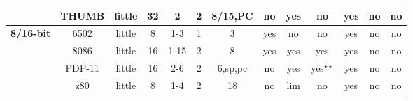 \begin{sidewaystable}[tbp]
\begin{sf}
\begin{footnotesize}
\begin{center}
\begin{tabular}{|c|c||c|c|c|c|c|c|c|c|c|c|c|}
                 & %
THUMB            & %
little           & %
32               & %
2                & %
2                & %
8/15,PC          & %
no               & %
yes              & %
no               & %
yes              & %
no               & %
no                 %
\\
\cline{2-13}

\hline
\hline

\multirow{3}{*}{\bf 8/16-bit} &
6502             & %
little           & %
8                & %
1-3              & %
1                & %
3                & %
yes              & %
no               & %
no               & %
yes              & %
no               & %
no                 %
\\
\cline{2-13}

                 & %
8086             & %
little           & %
16               & %
1-15             & %
2                & %
8                & %
yes              & %
yes              & %
yes 		 & %
yes              & %
no               & %
no                 %
\\
\cline{2-13}

                 & %
PDP-11           & %
little           & %
16               & %
2-6              & %
2                & %
6,sp,pc          & %
no               & %
yes              & %
yes$^{\star\star}$& %
yes              & %
no               & %
no                 %
\\
\cline{2-13}

                 & %
z80              & %
little           & %
8                & %
1-4              & %
2                & %
18               & %
no               & %
lim              & %
no 		 & %
yes              & %
no               & %
no                 %
\\
\cline{2-13}


\end{tabular}
\end{center}
\end{footnotesize}
\end{sf}
\end{sidewaystable}
